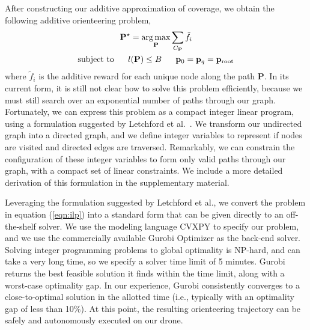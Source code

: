 After constructing our additive approximation of coverage, we obtain the following additive orienteering problem, 
%
\begin{equation}
\begin{aligned}
\mathbf{P}^{\star} = \operatorname*{arg\,max}_{\mathbf{P}} \sum_{C_{\mathbf{P}}} \tilde f_i~~~~~~~~~~~~~~~\\
\text{subject to} ~~~~~ l(\mathbf{P}) \leq B ~~~~~ \mathbf{p}_0 = \mathbf{p}_q = \mathbf{p}_\text{root}
\end{aligned}
\label{eqn:ilp}
\end{equation}
%
where $\tilde f_i$ is the additive reward for each unique      node along the path $\mathbf{P}$.
In its current form, it is still not clear how to solve this problem efficiently, because we must still search over an exponential number of paths through our graph.
Fortunately, we can express this problem as a compact integer linear program, using a formulation suggested by Letchford et al.~\cite{letchford:2013}.
We transform our undirected graph into a directed graph, and we define integer variables to represent if nodes are visited and directed edges are traversed.
Remarkably, we can constrain the configuration of these integer variables to form only valid paths through our graph, with a compact set of linear constraints.
We include a more detailed derivation of this formulation in the supplementary material.

Leveraging the formulation suggested by Letchford et al., we convert the problem in equation (\ref{eqn:ilp}) into a standard form that can be given directly to an off-the-shelf solver.
We use the modeling language CVXPY \cite{cvxpy:2016} to specify our problem, and we use the commercially available Gurobi Optimizer \cite{gurobi:2017} as the back-end solver.
Solving integer programming problems to global optimality is NP-hard, and can take a very long time, so we specify a solver time limit of 5 minutes.
Gurobi returns the best feasible solution it finds within the time limit, along with a worst-case optimality gap.
In our experience, Gurobi consistently converges to a close-to-optimal solution in the allotted time (i.e., typically with an optimality gap of less than 10\%).
At this point, the resulting orienteering trajectory can be safely and autonomously executed on our drone.


